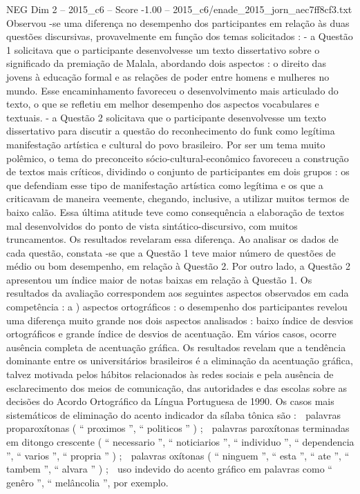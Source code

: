 \begin{textsample}{NEG Dim 2 – 2015\_c6 – Score -1.00 – 2015\_c6/enade\_2015\_jorn\_aec7ff8cf3.txt}
Observou -se uma diferença no desempenho dos participantes em relação às duas questões discursivas, provavelmente em função dos temas solicitados : - a Questão 1 solicitava que o participante desenvolvesse um texto dissertativo sobre o significado da premiação de Malala, abordando dois aspectos : o direito das jovens à educação formal e as relações de poder entre homens e mulheres no mundo.
Esse encaminhamento favoreceu o desenvolvimento mais articulado do texto, o que se refletiu em melhor desempenho dos aspectos vocabulares e textuais. - a Questão 2 solicitava que o participante desenvolvesse um texto dissertativo para discutir a questão do reconhecimento do funk como legítima manifestação artística e cultural do povo brasileiro.
Por ser um tema muito polêmico, o tema do preconceito sócio-cultural-econômico favoreceu a construção de textos mais críticos, dividindo o conjunto de participantes em dois grupos : os que defendiam esse tipo de manifestação artística como legítima e os que a criticavam de maneira veemente, chegando, inclusive, a utilizar muitos termos de baixo calão.
Essa última atitude teve como consequência a elaboração de textos mal desenvolvidos do ponto de vista sintático-discursivo, com muitos truncamentos.
Os resultados revelaram essa diferença.
Ao analisar os dados de cada questão, constata -se que a Questão 1 teve maior número de questões de médio ou bom desempenho, em relação à Questão 2.
Por outro lado, a Questão 2 apresentou um índice maior de notas baixas em relação à Questão 1.
Os resultados da avaliação correspondem aos seguintes aspectos observados em cada competência : a ) aspectos ortográficos : o desempenho dos participantes revelou uma diferença muito grande nos dois aspectos analisados : baixo índice de desvios ortográficos e grande índice de desvios de acentuação.
Em vários casos, ocorre ausência completa de acentuação gráfica.
Os resultados revelam que a tendência dominante entre os universitários brasileiros é a eliminação da acentuação gráfica, talvez motivada pelos hábitos relacionados às redes sociais e pela ausência de esclarecimento dos meios de comunicação, das autoridades e das escolas sobre as decisões do Acordo Ortográfico da Língua Portuguesa de 1990.
Os casos mais sistemáticos de eliminação do acento indicador da sílaba tônica são :  palavras proparoxítonas ( “ proximos ”, “ politicos ” ) ;  palavras paroxítonas terminadas em ditongo crescente ( “ necessario ”, “ noticiarios ”, “ individuo ”, “ dependencia ”, “ varios ”, “ propria ” ) ;  palavras oxítonas ( “ ninguem ”, “ esta ”, “ ate ”, “ tambem ”, “ alvara ” ) ;  uso indevido do acento gráfico em palavras como “ genêro ”, “ melâncolia ”, por exemplo.

\end{textsample}
